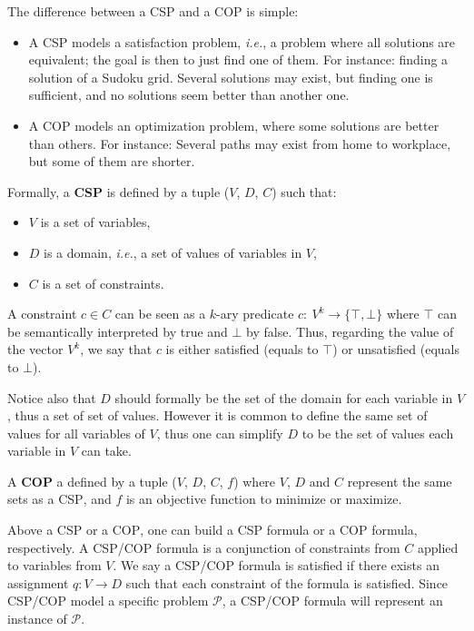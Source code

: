 \documentclass[journal]{IEEEtran}
\newcommand{\csp}{\textsc{CSP}\xspace}
\newcommand{\cop}{\textsc{COP}\xspace}
\newcommand{\ie}{\textit{i.e.}}
\begin{document}
The difference between a \csp and a \cop is simple:
\begin{itemize}
\item A \csp  models a satisfaction problem, \ie, a  problem where all
  solutions  are equivalent;  the goal  is then  to just  find one  of
  them. For  instance: finding  a solution of  a Sudoku  grid. Several
  solutions may exist, but finding one is sufficient, and no solutions
  seem better than another one.
\item A \cop models an  optimization problem, where some solutions are
  better than others.  For instance: Several paths may exist from home
  to workplace, but some of them are shorter.
\end{itemize}
Formally, a {\bf \csp} is defined by a tuple ($V$, $D$, $C$) such that:
\begin{itemize}
\item $V$ is a set of variables,
\item $D$ is a domain, \ie, a set of values of variables in $V$,
\item $C$ is a set of constraints.
\end{itemize}

A  constraint  $c   \in  C$  can  be  seen  as   a  $k$-ary  predicate
$c:~V^k\rightarrow\{\top,\bot\}$ where $\top$ can be semantically
interpreted by true and $\bot$ by  false. Thus, regarding the value of
the  vector $V^k$,  we say  that $c$  is either  satisfied (equals  to
$\top$) or unsatisfied (equals to $\bot$).

Notice also that $D$ should formally be the set of the domain for each
variable in $V$, thus a set of  set of values. However it is common to
define the same set  of values for all variables of  $V$, thus one can
simplify $D$ to be the set of values each variable in $V$ can take.

A {\bf \cop} a defined by a tuple ($V$, $D$, $C$, $f$) where $V$, $D$ and
$C$  represent the  same  sets as  a  \csp, and  $f$  is an  objective
function to minimize  or maximize.

Above  a \csp  or a  \cop, one  can  build a  \csp formula  or a  \cop
formula,  respectively.   A  \csp/\cop  formula is  a  conjunction  of
constraints from $C$ applied to variables from $V$. We say a \csp/\cop
formula is satisfied  if there exists an assignment  $q: V \rightarrow
D$  such that  each constraint  of  the formula  is satisfied.   Since
\csp/\cop model a specific  problem $\mathcal{P}$, a \csp/\cop formula
will represent an instance of $\mathcal{P}$.
\end{document}
